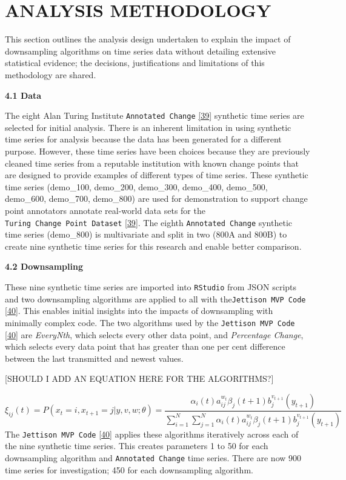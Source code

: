 \documentclass{article}
\begin{document}
\hypertarget{analysis-methodology}{%
\section{ANALYSIS METHODOLOGY}\label{analysis-methodology}}

This section outlines the analysis design undertaken to explain the
impact of downsampling algorithms on time series data without detailing
extensive statistical evidence; the decisions, justifications and
limitations of this methodology are shared.

\textbf{4.1 Data}

The eight Alan Turing Institute \texttt{Annotated\ Change}
\protect\hyperlink{ref-ATIChangePoint}{{[}39{]}} synthetic time series
are selected for initial analysis. There is an inherent limitation in
using synthetic time series for analysis because the data has been
generated for a different purpose. However, these time series have been
choices because they are previously cleaned time series from a reputable
institution with known change points that are designed to provide
examples of different types of time series. These synthetic time series
(demo\_100, demo\_200, demo\_300, demo\_400, demo\_500, demo\_600,
demo\_700, demo\_800) are used for demonstration to support change point
annotators annotate real-world data sets for the
\texttt{Turing\ Change\ Point\ Dataset}
\protect\hyperlink{ref-ATIChangePoint}{{[}39{]}}. The eighth
\texttt{Annotated\ Change} synthetic time series (demo\_800) is
multivariate and split in two (800A and 800B) to create nine synthetic
time series for this research and enable better comparison.

\textbf{4.2 Downsampling}

These nine synthetic time series are imported into \texttt{RStudio} from
JSON scripts and two downsampling algorithms are applied to all with
the\texttt{Jettison\ MVP\ Code}
\protect\hyperlink{ref-Jettison}{{[}40{]}}. This enables initial
insights into the impacts of downsampling with minimally complex code.
The two algorithms used by the \texttt{Jettison\ MVP\ Code}
\protect\hyperlink{ref-Jettison}{{[}40{]}} are \emph{EveryNth}, which
selects every other data point, and \emph{Percentage Change}, which
selects every data point that has greater than one per cent difference
between the last transmitted and newest values.

{[}SHOULD I ADD AN EQUATION HERE FOR THE ALGORITHMS?{]}

\[
\xi _{ij}(t)=P(x_{t}=i,x_{t+1}=j|y,v,w;\theta)= {\frac {\alpha _{i}(t)a^{w_t}_{ij}\beta _{j}(t+1)b^{v_{t+1}}_{j}(y_{t+1})}{\sum _{i=1}^{N} \sum _{j=1}^{N} \alpha _{i}(t)a^{w_t}_{ij}\beta _{j}(t+1)b^{v_{t+1}}_{j}(y_{t+1})}}
\] The \texttt{Jettison\ MVP\ Code}
\protect\hyperlink{ref-Jettison}{{[}40{]}} applies these algorithms
iteratively across each of the nine synthetic time series. This creates
parameters 1 to 50 for each downsampling algorithm and
\texttt{Annotated\ Change} time series. There are now 900 time series
for investigation; 450 for each downsampling algorithm.
\end{document}
